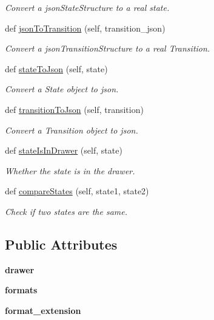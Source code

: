 \begin{DoxyCompactItemize}
\begin{DoxyCompactList}\small\item\em Convert a json\+State\+Structure to a real state. \end{DoxyCompactList}\item 
def \mbox{\hyperlink{classIO_1_1IO_a18ce7cd8a1b80106a9ecc5d1e6b55cab}{json\+To\+Transition}} (self, transition\+\_\+json)
\begin{DoxyCompactList}\small\item\em Convert a json\+Transition\+Structure to a real Transition. \end{DoxyCompactList}\item 
def \mbox{\hyperlink{classIO_1_1IO_a69ce4e417f3e5d3be96be4915bb59b9a}{state\+To\+Json}} (self, state)
\begin{DoxyCompactList}\small\item\em Convert a State object to json. \end{DoxyCompactList}\item 
def \mbox{\hyperlink{classIO_1_1IO_a76a03d86d935add42da0a49f6ff5c77f}{transition\+To\+Json}} (self, transition)
\begin{DoxyCompactList}\small\item\em Convert a Transition object to json. \end{DoxyCompactList}\item 
def \mbox{\hyperlink{classIO_1_1IO_a93e10f1b6d439ea1d12ea3568d84cc5b}{state\+Is\+In\+Drawer}} (self, state)
\begin{DoxyCompactList}\small\item\em Whether the state is in the drawer. \end{DoxyCompactList}\item 
def \mbox{\hyperlink{classIO_1_1IO_a1a894bd977cbe82c91a6291b1312e755}{compare\+States}} (self, state1, state2)
\begin{DoxyCompactList}\small\item\em Check if two states are the same. \end{DoxyCompactList}\end{DoxyCompactItemize}
\subsection*{Public Attributes}
\begin{DoxyCompactItemize}
\item 
\mbox{\label{classIO_1_1IO_a36a4e689edd751185fcaf0a50a8d8c05}} 
{\bfseries drawer}
\item 
\mbox{\label{classIO_1_1IO_a13f87ef2974dfa0105f1d620f60947e2}} 
{\bfseries formats}
\item 
\mbox{\label{classIO_1_1IO_a3d96e44bc68635ef60cfbed47938a39d}} 
{\bfseries format\+\_\+extension}
\end{DoxyCompactItemize}


